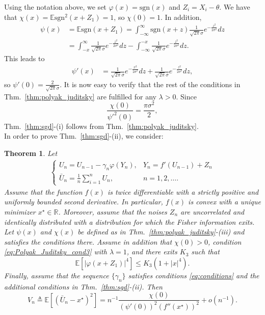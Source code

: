 \documentclass[letterpaper, conference]{IEEEtran}      %
\newtheorem{thm}{\bf{Theorem}}
\newcommand{\sgn}{\mathrm{sgn} }
\begin{document}
Using the notation above, we set $\varphi(x) = \sgn(x)$ and $Z_i = X_i - \theta$. We have that $\chi(x) = \mathbb E \sgn^2(x+Z_1) = 1$, so $\chi(0) = 1$. In addition,
\begin{align*}
\psi(x) & = \mathbb E \sgn(x+ Z_1) = \int_{-\infty}^\infty \sgn(x+z) \frac{1}{\sqrt{2\pi}\sigma} e^{-\frac{z^2}{2\sigma^2}} dz \\
& = \int_{-x}^\infty \frac{1}{\sqrt{2\pi}\sigma} e^{-\frac{z^2}{2\sigma^2}} dz -\int_{-\infty}^{-x} \frac{1}{\sqrt{2\pi}\sigma} e^{-\frac{z^2}{2\sigma^2}} dz.
\end{align*}
This leads to 
\begin{align*}
\psi'(x) & = \frac{1}{\sqrt{2\pi}\sigma} e^{-\frac{x^2}{2\sigma^2}} dz +\frac{1}{\sqrt{2\pi}\sigma} e^{-\frac{z^2}{2\sigma^2}} dz,
\end{align*}
so $\psi'(0) = \frac{2}{\sqrt{2\pi}\sigma}$. It is now easy to verify that the rest of the conditions in Thm.~\ref{thm:polyak_juditsky} are fulfilled for any $\lambda > 0$. Since 
\[
\frac{\chi(0)}{\psi'^2(0)} = \frac{\pi \sigma^2}{2},
\]
Thm.~\ref{thm:sgd}-(i) follows from Thm.~\ref{thm:polyak_juditsky}.  \\
In order to prove Thm.~\ref{thm:sgd}-(ii), we consider:
\begin{thm}{ \cite[Thm. 2]{polyak1990new}} \label{thm:polyak_new}
Let
\begin{align} \label{eq:polyak_new_measurements}
\begin{cases}
U_n = U_{n-1} - \gamma_n \varphi(Y_n), & Y_n = f'(U_{n-1})+Z_n \\
\bar{U}_n= \frac{1}{n} \sum_{i=1}^n U_n, & n=1,2,\ldots.
\end{cases}
\end{align}
Assume that the function $f(x)$ is twice differentiable with a strictly positive and uniformly bounded second derivative. In particular, $f(x)$ is convex with a unique minimizer $x^\star \in \mathbb R$. Moreover, assume that the noises $Z_n$ are uncorrelated and identically distributed with a distribution for which the Fisher information exits. Let $\psi(x)$ and $\chi(x)$ be defined as in  Thm.~\ref{thm:polyak_juditsky}-(iii) and satisfies the conditions there. Assume in addition that $\chi(0)>0$, condition \eqref{eq:Polyak_Juditsky_cond3} with $\lambda = 1$, 
and there exits $K_3$ such that 
\[
\mathbb E \left[ | \varphi(x+Z_1) |^4 \right] \leq K_3(1+|x|^4). 
\]
Finally, assume that the sequence $\{\gamma_n \}$ satisfies conditions \eqref{eq:conditions} and the additional conditions in Thm.~\ref{thm:sgd}-(ii). Then
\[
V_n \triangleq \mathbb E \left[ \left(\bar{U}_n-x^\star \right)^2 \right] = n^{-1}\frac{\chi(0)} { (\psi'(0))^2 (f''(x^\star))^2 } + o(n^{-1}).
\]
\end{thm}
\end{document}
